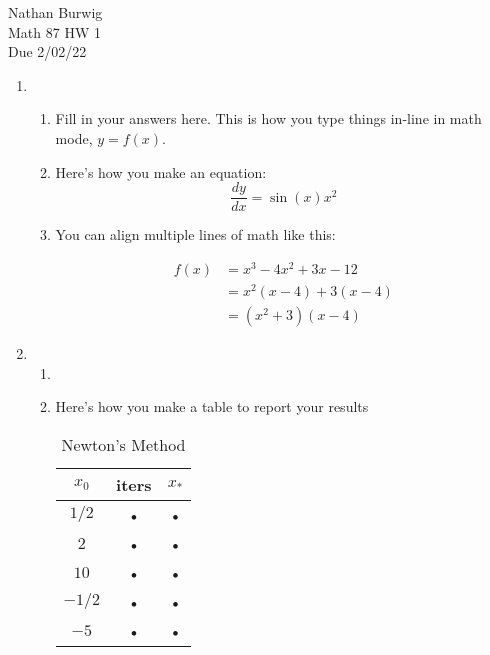\documentclass[11pt]{article}
\begin{document}
\noindent Nathan Burwig \\
Math 87 HW 1 \\
Due 2/02/22 

\hrulefill



\begin{enumerate}




\item 
\begin{enumerate}
\item Fill in your answers here. This is how you type things in-line in math mode, $y = f(x)$.


\item Here's how you make an equation:
	\begin{equation*}
	\frac{dy}{dx} = \sin(x) x^2 
	\end{equation*}


\item You can align multiple lines of math like this:

	\begin{align*}
	f(x) &= x^3 - 4x^2 + 3x - 12 \\
		&= x^2(x - 4) + 3(x-4) \\
		&= (x^2 + 3)(x-4)
	\end{align*}  


\end{enumerate}



\item  
\begin{enumerate} 
\item 
\item  Here's how you make a table to report your results \\

	\begin{table}[H]
	\begin{center}
	\begin{tabular}{|c|c|c|}
	\hline 
	$x_0$ & iters & $x_*$ \\ 
	\hline 
	$1/2$ & • & • \\ 
	\hline 
	$2$ & • & • \\ 
	\hline 
	$10$ & • & • \\ 
	\hline 
	$-1/2$ & • & • \\ 
	\hline 
	$-5$ & • & • \\ 
	\hline 
	\end{tabular} 
	\caption{Newton's Method}
	\end{center}
	\end{table}
	


\end{enumerate}
\end{enumerate}
\end{document}
